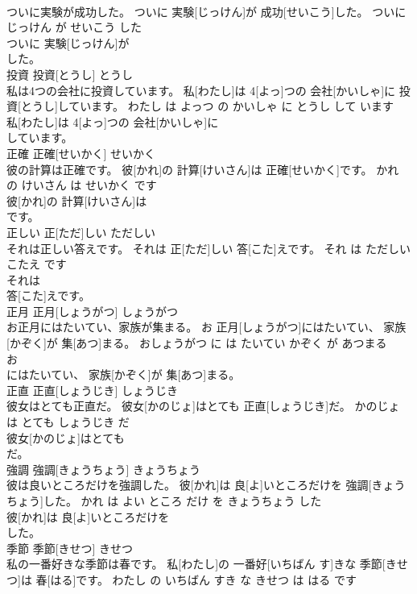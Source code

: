 \documentclass[8pt]{extreport}
\begin{document}
\begin{CJK}{UTF8}{min}
\\	ついに実験が成功した。	ついに 実験[じっけん]が 成功[せいこう]した。	ついに じっけん が せいこう した	
\\	ついに 実験[じっけん]が
\\	した。			
\\	投資	投資[とうし]	とうし	
\\	私は4つの会社に投資しています。	私[わたし]は 4[よっ]つの 会社[かいしゃ]に 投資[とうし]しています。	わたし は よっつ の かいしゃ に とうし して います	
\\	私[わたし]は 4[よっ]つの 会社[かいしゃ]に
\\	しています。			
\\	正確	正確[せいかく]	せいかく	
\\	彼の計算は正確です。	彼[かれ]の 計算[けいさん]は 正確[せいかく]です。	かれ の けいさん は せいかく です	
\\	彼[かれ]の 計算[けいさん]は
\\	です。			
\\	正しい	正[ただ]しい	ただしい	
\\	それは正しい答えです。	それは 正[ただ]しい 答[こた]えです。	それ は ただしい こたえ です	
\\	それは
\\	答[こた]えです。			
\\	正月	正月[しょうがつ]	しょうがつ	
\\	お正月にはたいてい、家族が集まる。	お 正月[しょうがつ]にはたいてい、 家族[かぞく]が 集[あつ]まる。	おしょうがつ に は たいてい かぞく が あつまる	
\\	お
\\	にはたいてい、 家族[かぞく]が 集[あつ]まる。			
\\	正直	正直[しょうじき]	しょうじき	
\\	彼女はとても正直だ。	彼女[かのじょ]はとても 正直[しょうじき]だ。	かのじょ は とても しょうじき だ	
\\	彼女[かのじょ]はとても
\\	だ。			
\\	強調	強調[きょうちょう]	きょうちょう	
\\	彼は良いところだけを強調した。	彼[かれ]は 良[よ]いところだけを 強調[きょうちょう]した。	かれ は よい ところ だけ を きょうちょう した	
\\	彼[かれ]は 良[よ]いところだけを
\\	した。			
\\	季節	季節[きせつ]	きせつ	
\\	私の一番好きな季節は春です。	私[わたし]の 一番好[いちばん す]きな 季節[きせつ]は 春[はる]です。	わたし の いちばん すき な きせつ は はる です	

\end{CJK}
\end{document}
